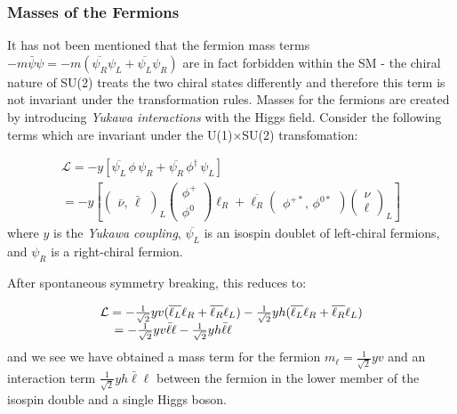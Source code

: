 \subsubsection{Masses of the Fermions}

It has not been mentioned that the fermion mass terms $-m\bar{\psi}\psi = -m( \overline{\psi_{R}} \psi_{L} + \overline{\psi_{L}}\psi_{R})$ are in fact forbidden within the SM - the chiral nature of SU(2) treats the two chiral states differently and therefore this term is not invariant under the transformation rules. Masses for the fermions are created by introducing \textit{Yukawa interactions} with the Higgs field. Consider the following terms which are invariant under the U(1)$\times$SU(2) transfomation:

\begin{equation}
\begin{array}{l}
\mathcal{L} = -y [ \overline{\psi_{L}} \, \phi \, \psi_{R} + \overline{\psi_{R}} \, \phi^{\dagger} \, \psi_{L}]\\
=  -y\left[\begin{pmatrix} \bar{\nu},\,\bar{\ell}\end{pmatrix}_{L} \begin{pmatrix} \phi^{+} \\ \phi^{0} \end{pmatrix} \ell_{R} + 
\overline{\ell_{R}} \begin{pmatrix} \phi^{+*},\,\phi^{0*} \end{pmatrix} \begin{pmatrix} \nu \\ \ell \end{pmatrix}_{L}\right]
\end{array}
\end{equation}
where $y$ is the \textit{Yukawa coupling}, $\overline{\psi_{L}}$ is an isospin doublet of left-chiral fermions, and $\psi_{R}$ is a right-chiral fermion.

After spontaneous symmetry breaking, this reduces to:

\begin{equation}
\begin{array}{l}
\mathcal{L} =
-\frac{1}{\sqrt{2}}yv (\overline{\ell_{L}}\ell_{R} + \overline{\ell_{R}}\ell_{L})
-\frac{1}{\sqrt{2}}yh (\overline{\ell_{L}}\ell_{R} + \overline{\ell_{R}}\ell_{L})\\
\hspace{4mm} = - \frac{1}{\sqrt{2}} yv \bar{\ell}\ell - \frac{1}{\sqrt{2}} y h \bar{\ell}\ell
\end{array}
\end{equation}
and we see we have obtained a mass term for the fermion $m_{\ell} = \frac{1}{\sqrt{2}} yv$ and an interaction term $\frac{1}{\sqrt{2}} y h \bar{\ell}\ell$ between the fermion in the lower member of the isospin double and a single Higgs boson.

